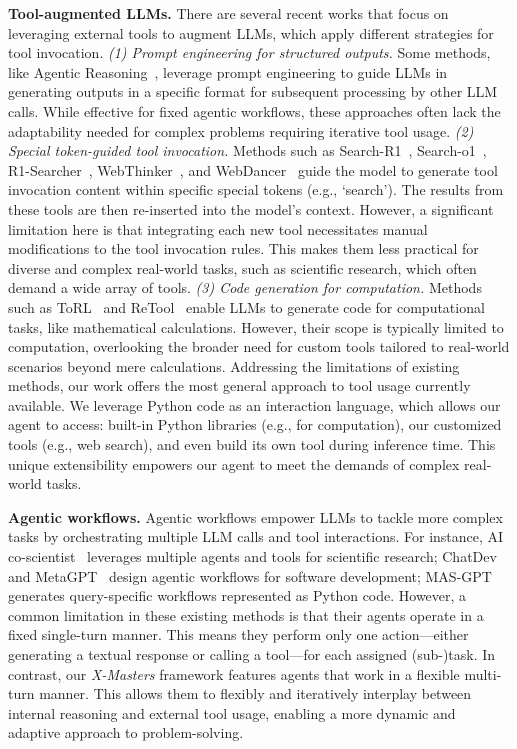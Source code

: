 \documentclass{article}
\begin{document}
\textbf{Tool-augmented LLMs.}
There are several recent works that focus on leveraging external tools to augment LLMs, which apply different strategies for tool invocation.
\textit{(1) Prompt engineering for structured outputs.}
Some methods, like Agentic Reasoning~\citep{agentic_reasoning}, leverage prompt engineering to guide LLMs in generating outputs in a specific format for subsequent processing by other LLM calls. 
While effective for fixed agentic workflows, these approaches often lack the adaptability needed for complex problems requiring iterative tool usage.
\textit{(2) Special token-guided tool invocation.}
Methods such as Search-R1~\citep{search-r1}, Search-o1~\citep{search-o1}, R1-Searcher~\citep{r1-searcher}, WebThinker~\citep{webthinker}, and WebDancer~\citep{webdancer} guide the model to generate tool invocation content within specific special tokens (e.g., `search').
The results from these tools are then re-inserted into the model's context. 
However, a significant limitation here is that integrating each new tool necessitates manual modifications to the tool invocation rules.
This makes them less practical for diverse and complex real-world tasks, such as scientific research, which often demand a wide array of tools.
\textit{(3) Code generation for computation.}
Methods such as ToRL~\citep{ToRL} and ReTool~\citep{Retool} enable LLMs to generate code for computational tasks, like mathematical calculations.
However, their scope is typically limited to computation, overlooking the broader need for custom tools tailored to real-world scenarios beyond mere calculations.
Addressing the limitations of existing methods, our work offers the most general approach to tool usage currently available.
We leverage Python code as an interaction language, which allows our agent to access: built-in Python libraries (e.g., for computation), our customized tools (e.g., web search), and even build its own tool during inference time.
This unique extensibility empowers our agent to meet the demands of complex real-world tasks.

\textbf{Agentic workflows.}
Agentic workflows empower LLMs to tackle more complex tasks by orchestrating multiple LLM calls and tool interactions.
For instance, AI co-scientist~\citep{gottweis2025towards} leverages multiple agents and tools for scientific research; ChatDev~\citep{qian2024chatdev} and MetaGPT~\citep{hongmetagpt} design agentic workflows for software development; MAS-GPT~\citep{masgpt} generates query-specific workflows represented as Python code.
However, a common limitation in these existing methods is that their agents operate in a fixed single-turn manner.
This means they perform only one action—either generating a textual response or calling a tool—for each assigned (sub-)task.
In contrast, our \emph{X-Masters} framework features agents that work in a flexible multi-turn manner.
This allows them to flexibly and iteratively interplay between internal reasoning and external tool usage, enabling a more dynamic and adaptive approach to problem-solving.
\end{document}
